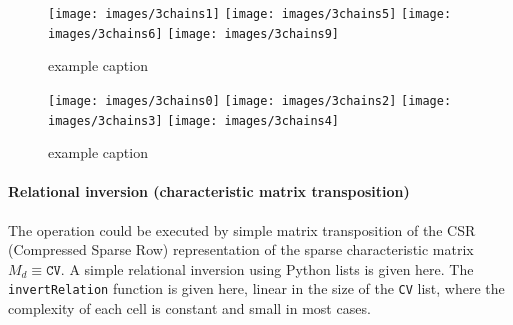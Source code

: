 \documentclass[11pt,oneside]{article}    %
\begin{document}
\begin{figure}[htbp] %
   \centering
   \texttt{[image: images/3chains1]} 
   \texttt{[image: images/3chains5]} 
   \texttt{[image: images/3chains6]} 
   \texttt{[image: images/3chains9]} 
   \caption{example caption}
   \label{fig:example}
\end{figure}

\begin{figure}[htbp] %
   \centering
   \texttt{[image: images/3chains0]} 
   \texttt{[image: images/3chains2]} 
   \texttt{[image: images/3chains3]} 
   \texttt{[image: images/3chains4]} 
   \caption{example caption}
   \label{fig:example}
\end{figure}

\paragraph{Relational inversion (characteristic matrix transposition)}

The operation could be executed by simple matrix transposition of the CSR (Compressed Sparse Row) representation of the sparse characteristic matrix $M_d \equiv \texttt{CV}$.
A simple relational inversion using Python lists is given here. The \texttt{invertRelation} function 
is given here, linear in the size of the \texttt{CV} list, where the complexity of each cell is constant and 
small in most cases.
\end{document}
